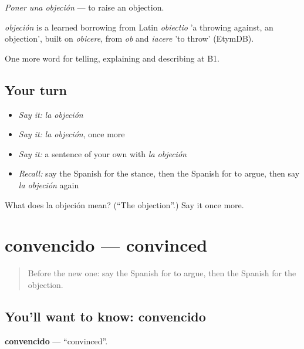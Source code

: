\emph{Poner una objeción} — to raise an objection.

\begin{cousinweb}
\emph{objeción} is a learned borrowing from Latin \emph{obiectio} 'a throwing against, an objection', built on \emph{obicere}, from \emph{ob} and \emph{iacere} 'to throw' (EtymDB).
\end{cousinweb}

\begin{grammarlens}[title={What you've built}]
One more word for telling, explaining and describing at B1.
\end{grammarlens}

\subsection*{Your turn}
\begin{itemize}
\raggedright
  \item \emph{Say it:} \emph{la objeción}
  \item \emph{Say it:} \emph{la objeción}, once more
  \item \emph{Say it:} a sentence of your own with \emph{la objeción}
  \item \emph{Recall:} say the Spanish for the stance, then the Spanish for to argue, then say \emph{la objeción} again
\end{itemize}

\begin{tcolorbox}[breakable,colback=teal!4,colframe=teal!35!black,title={Before you move on}]
What does la objeción mean? (\textquotedblleft{}The objection\textquotedblright{}.) Say it once more.
\end{tcolorbox}
\section[convencido]{convencido — convinced}

\label{lesson:ES-C577-convencido}



\begin{quote}
Before the new one: say the Spanish for to argue, then the Spanish for the objection.
\end{quote}

\subsection*{You'll want to know: convencido}
\textbf{convencido} — \textquotedblleft{}convinced\textquotedblright{}.

